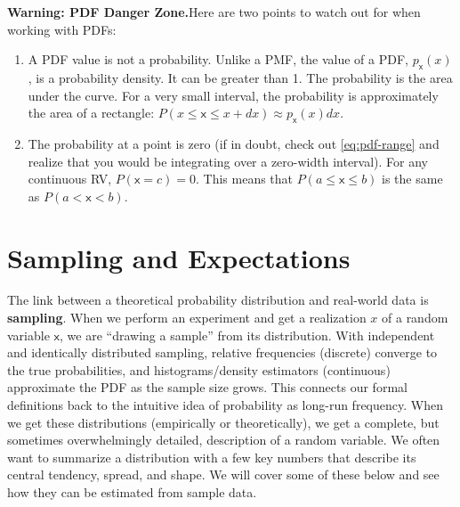 \begin{warningBox}
    \textbf{Warning: PDF Danger Zone.}\quad Here are two points to watch out for when working with PDFs:
    \begin{enumerate}
        \item A PDF value is not a probability. Unlike a PMF, the value of a PDF, $p_{\mathsf{x}}(x)$, is a probability density. It can be greater than 1. The probability is the area under the curve. For a very small interval, the probability is approximately the area of a rectangle: $P(x \le \mathsf{x} \le x+dx) \approx p_{\mathsf{x}}(x)dx$.
        \item The probability at a point is zero (if in doubt, check out \autoref{eq:pdf-range} and realize that you would be integrating over a zero-width interval). For any continuous RV, $P(\mathsf{x}=c)=0$. This means that $P(a \le \mathsf{x} \le b)$ is the same as $P(a < \mathsf{x} < b)$.
    \end{enumerate}
\end{warningBox}

\section{Sampling and Expectations}
The link between a theoretical probability distribution and real-world data is \textbf{sampling}. When we perform an experiment and get a realization $x$ of a random variable $\mathsf{x}$, we are ``drawing a sample'' from its distribution. With independent and identically distributed sampling, relative frequencies (discrete) converge to the true probabilities, and histograms/density estimators (continuous) approximate the PDF as the sample size grows. This connects our formal definitions back to the intuitive idea of probability as long-run frequency. When we get these distributions (empirically or theoretically), we get a complete, but sometimes overwhelmingly detailed, description of a random variable. We often want to summarize a distribution with a few key numbers that describe its central tendency, spread, and shape. We will cover some of these below and see how they can be estimated from sample data.

